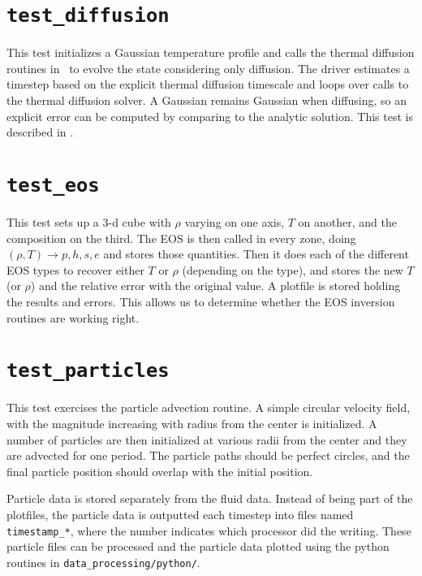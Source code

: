   
\section {\tt test\_diffusion}

  This test initializes a Gaussian temperature profile and calls
  the thermal diffusion routines in \maestro\ to evolve the state 
  considering only diffusion.  The driver estimates a timestep
  based on the explicit thermal diffusion timescale and loops
  over calls to the thermal diffusion solver.  A Gaussian remains
  Gaussian when diffusing, so an explicit error can be computed
  by comparing to the analytic solution.  This test is 
  described in \cite{xrb}.


\section {\tt test\_eos}

  This test sets up a 3-d cube with $\rho$ varying on one axis, $T$ on
  another, and the composition on the third.  The EOS is then called
  in every zone, doing $(\rho, T) \rightarrow  p, h, s, e$  and stores those
  quantities.  Then it does each of the different EOS types to recover
  either $T$ or $\rho$ (depending on the type), and stores the new $T$ (or
  $\rho$) and the relative error with the original value.  A plotfile is
  stored holding the results and errors.  This allows us to determine
  whether the EOS inversion routines are working right.


\section {\tt test\_particles}

  This test exercises the particle advection routine.  A simple
  circular velocity field, with the magnitude increasing with radius
  from the center is initialized.  A number of particles are then
  initialized at various radii from the center and they are advected
  for one period.  The particle paths should be perfect circles, and
  the final particle position should overlap with the initial
  position.

  Particle data is stored separately from the fluid data.  Instead
  of being part of the plotfiles, the particle data is outputted
  each timestep into files named {\tt timestamp\_*}, where 
  the number indicates which processor did the writing.  These
  particle files can be processed and the particle data plotted
  using the python routines in {\tt data\_processing/python/}.

